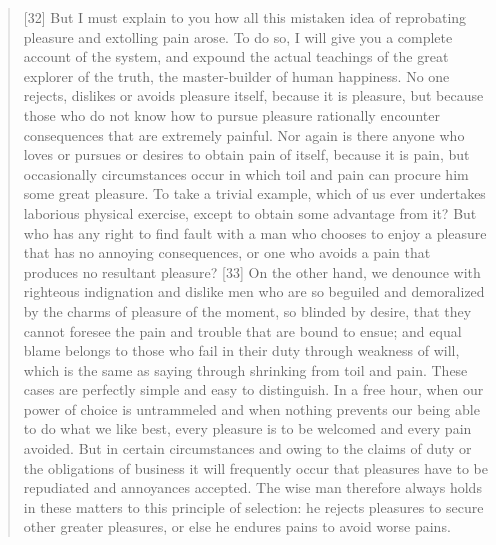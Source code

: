 \begin{quotation}
[32] But I must explain to you how all this mistaken idea of reprobating
pleasure and extolling pain arose. To do so, I will give you a complete account
of the system, and expound the actual teachings of the great explorer of the
truth, the master-builder of human happiness. No one rejects, dislikes or
avoids pleasure itself, because it is pleasure, but because those who do not
know how to pursue pleasure rationally encounter consequences that are
extremely painful. Nor again is there anyone who loves or pursues or desires to
obtain pain of itself, because it is pain, but occasionally circumstances occur
in which toil and pain can procure him some great pleasure. To take a trivial
example, which of us ever undertakes laborious physical exercise, except to
obtain some advantage from it? But who has any right to find fault with a man
who chooses to enjoy a pleasure that has no annoying consequences, or one who
avoids a pain that produces no resultant pleasure? [33] On the other hand, we
denounce with righteous indignation and dislike men who are so beguiled and
demoralized by the charms of pleasure of the moment, so blinded by desire, that
they cannot foresee the pain and trouble that are bound to ensue; and equal
blame belongs to those who fail in their duty through weakness of will, which
is the same as saying through shrinking from toil and pain. These cases are
perfectly simple and easy to distinguish. In a free hour, when our power of
choice is untrammeled and when nothing prevents our being able to do what we
like best, every pleasure is to be welcomed and every pain avoided. But in
certain circumstances and owing to the claims of duty or the obligations of
business it will frequently occur that pleasures have to be repudiated and
annoyances accepted. The wise man therefore always holds in these matters to
this principle of selection: he rejects pleasures to secure other greater
pleasures, or else he endures pains to avoid worse pains. \cite{lorem_ipsum}
\end{quotation}

